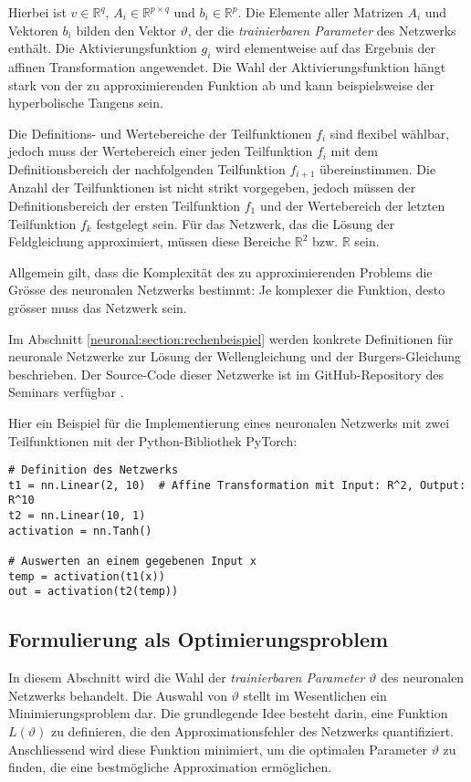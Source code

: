 Hierbei ist \( v \in \mathbb{R}^q \), \( A_i \in \mathbb{R}^{p \times q} \) und \( b_i \in \mathbb{R}^p \). Die Elemente aller Matrizen \( A_i \) und Vektoren \( b_i \) bilden den Vektor \( \vartheta \), der die \emph{trainierbaren Parameter} des Netzwerks enthält.
Die Aktivierungsfunktion \( g_i \) wird elementweise auf das Ergebnis der affinen Transformation angewendet.
Die Wahl der Aktivierungsfunktion hängt stark von der zu approximierenden Funktion ab und kann beispielsweise der hyperbolische Tangens sein.

Die Definitions- und Wertebereiche der Teilfunktionen \( f_i \) sind flexibel wählbar, jedoch muss der Wertebereich einer jeden Teilfunktion \( f_i \) mit dem Definitionsbereich der nachfolgenden Teilfunktion \( f_{i+1} \) übereinstimmen.
Die Anzahl der Teilfunktionen ist nicht strikt vorgegeben, jedoch müssen der Definitionsbereich der ersten Teilfunktion \( f_1 \) und der Wertebereich der letzten Teilfunktion \( f_k \) festgelegt sein. 
Für das Netzwerk, das die Lösung der Feldgleichung approximiert, müssen diese Bereiche \( \mathbb{R}^2 \) bzw. \( \mathbb{R} \) sein.

Allgemein gilt, dass die Komplexität des zu approximierenden Problems die Grösse des neuronalen Netzwerks bestimmt: Je komplexer die Funktion, desto grösser muss das Netzwerk sein.

Im Abschnitt \ref{neuronal:section:rechenbeispiel} werden konkrete Definitionen für neuronale Netzwerke zur Lösung der Wellengleichung und der Burgers-Gleichung beschrieben.
Der Source-Code dieser Netzwerke ist im GitHub-Repository des Seminars verfügbar \cite{neuronal:github_source_code}.

Hier ein Beispiel für die Implementierung eines neuronalen Netzwerks mit zwei Teilfunktionen mit der Python-Bibliothek PyTorch:

\begin{lstlisting}
# Definition des Netzwerks
t1 = nn.Linear(2, 10)  # Affine Transformation mit Input: R^2, Output: R^10
t2 = nn.Linear(10, 1)
activation = nn.Tanh()

# Auswerten an einem gegebenen Input x
temp = activation(t1(x))
out = activation(t2(temp))
\end{lstlisting}

\subsection{Formulierung als Optimierungsproblem}\label{neuronal:subsection:optimierungsproblem}
In diesem Abschnitt wird die Wahl der \emph{trainierbaren Parameter} $\vartheta$ des neuronalen Netzwerks behandelt.
Die Auswahl von $\vartheta$ stellt im Wesentlichen ein Minimierungsproblem dar.
Die grundlegende Idee besteht darin, eine Funktion \( L(\vartheta) \) zu definieren, die den Approximationsfehler des Netzwerks quantifiziert.
Anschliessend wird diese Funktion minimiert, um die optimalen Parameter $\vartheta$ zu finden, die eine bestmögliche Approximation ermöglichen.


